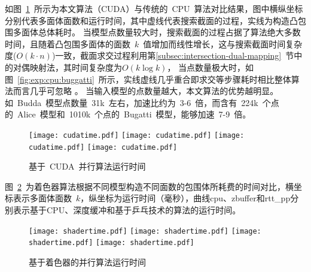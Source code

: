 如图~\ref{fig:chart:exps:cputime}~所示为本文算法（CUDA）与传统的~CPU~算法对比结果，图中横纵坐标分别代表多面体面数和运行时间，其中虚线代表搜索截面的过程，实线为构造凸包围多面体总体耗时。
当模型点数量较大时，搜索截面的过程占据了算法绝大多数时间，且随着凸包围多面体的面数~$k$~值增加而线性增长，这与搜索截面时间复杂度($O(k\cdot
n)$)一致，截面求交过程利用第\ref{subsec:intersection-dual-mapping}~节中的对偶映射法，其时间复杂度为$O(k\log k)$，
当点数量极大时，如图~\ref{fig:exp:cpu:buggatti}~所示，实线虚线几乎重合即求交等步骤耗时相比整体算法而言几乎可忽略
。
当输入模型的点数量越大，本文算法的优势越明显。如~Budda~模型点数量~31k~左右，加速比约为~3-6~倍，而含有~224k~个点的~Alice~模型和~1010k~个点的~Bugatti~模型，能够加速~7-9~倍。

\begin{figure}[htbp] %
\centering
{  
   \texttt{[image: cudatime.pdf]}
}
{  
    \texttt{[image: cudatime.pdf]}
}\linebreak %
{  
   \texttt{[image: cudatime.pdf]}
}
{  
   \texttt{[image: cudatime.pdf]}
}
\caption{基于~CUDA~并行算法运行时间}
\label{fig:chart:exps:cputime}
\end{figure}

图~\ref{fig:chart:exps:shadertime}~为着色器算法根据不同模型构造不同面数的包围体所耗费的时间对比，横坐标表示多面体面数~$k$，纵坐标为运行时间（毫秒），曲线cpu、zbuffer和rtt\_pp分别表示基于CPU、深度缓冲和基于乒乓技术的算法的运行时间。

\begin{figure}[htbp] %
\centering
{}
{  
   \texttt{[image: shadertime.pdf]}
}
{  
    \texttt{[image: shadertime.pdf]}
}\linebreak %
{  
   \texttt{[image: shadertime.pdf]}
}
{  
   \texttt{[image: shadertime.pdf]}
}
\caption{基于着色器的并行算法运行时间}
\label{fig:chart:exps:shadertime}
\end{figure}

